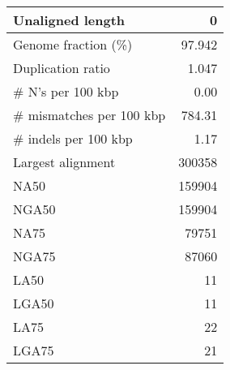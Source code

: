 \documentclass[12pt,a4paper]{article}
\begin{document}
\begin{table}[ht]
\begin{center}
\begin{tabular}{|l*{1}{|r}|}
Unaligned length & 0 \\ \hline
Genome fraction (\%) & 97.942 \\ \hline
Duplication ratio & 1.047 \\ \hline
\# N's per 100 kbp & 0.00 \\ \hline
\# mismatches per 100 kbp & 784.31 \\ \hline
\# indels per 100 kbp & 1.17 \\ \hline
Largest alignment & 300358 \\ \hline
NA50 & 159904 \\ \hline
NGA50 & 159904 \\ \hline
NA75 & 79751 \\ \hline
NGA75 & 87060 \\ \hline
LA50 & 11 \\ \hline
LGA50 & 11 \\ \hline
LA75 & 22 \\ \hline
LGA75 & 21 \\ \hline
\end{tabular}
\end{center}
\end{table}
\end{document}
